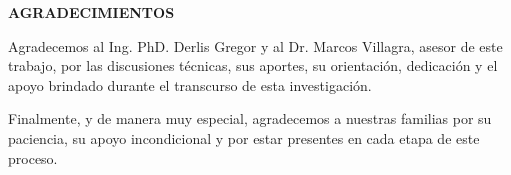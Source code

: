 \centerline{\textbf{\large AGRADECIMIENTOS}}

\vspace{1cm}

Agradecemos al Ing. PhD. Derlis Gregor y al Dr. Marcos Villagra, asesor de este trabajo, por las discusiones
técnicas, sus aportes, su orientación, dedicación y el apoyo brindado durante el transcurso de esta investigación.

Finalmente, y de manera muy especial, agradecemos a nuestras familias por su paciencia,
su apoyo incondicional y por estar presentes en cada etapa de este proceso.
